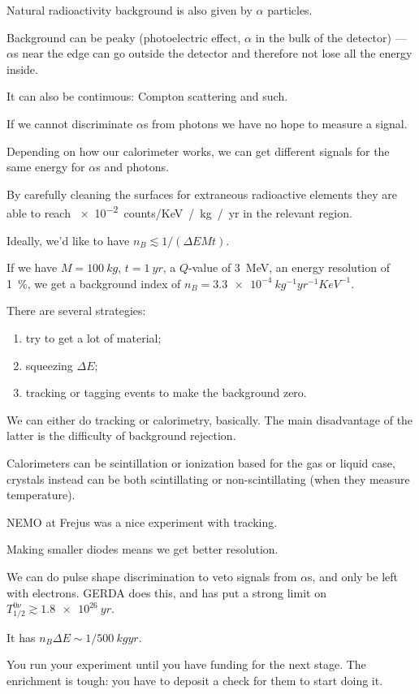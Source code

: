 \documentclass[main.tex]{subfiles}
\begin{document}

Natural radioactivity background is also given by \(\alpha \) particles. 

Background can be peaky (photoelectric effect, \(\alpha \) in the bulk of the detector) --- 
\(\alpha \)s near the edge can go outside the detector and therefore not lose all the energy inside.

It can also be continuous: Compton scattering and such. 

If we cannot discriminate \(\alpha \)s from photons we have no hope to measure a signal. 

Depending on how our calorimeter works, we can get different signals for the same energy 
for \(\alpha \)s and photons. 

By carefully cleaning the surfaces for extraneous radioactive elements 
they are able to reach \SI{e-2}{counts/ KeV / kg / yr} in the relevant region. 

Ideally, we'd like to have \(n_B \lesssim 1/ (\Delta E M t)\). 

If we have \(M = \SI{100}{kg}\), \(t = \SI{1}{yr}\), a \(Q\)-value of \SI{3}{MeV}, 
an energy resolution of \SI{1}{\percent}, 
we get a background index of \(n_B = \SI{3.3e-4}{kg^{-1} yr^{-1} KeV^{-1}}\). 

There are several strategies: 
\begin{enumerate}
    \item try to get a lot of material;
    \item squeezing \(\Delta E\);
    \item tracking or tagging events to make the background zero.
\end{enumerate}

We can either do tracking or calorimetry, basically. 
The main disadvantage of the latter is the difficulty of background rejection. 

Calorimeters can be scintillation or ionization based for the gas or liquid case, 
crystals instead can be both scintillating or non-scintillating 
(when they measure temperature). 

NEMO at Frejus was a nice experiment with tracking. 

Making smaller diodes means we get better resolution. 

We can do pulse shape discrimination to veto signals from \(\alpha \)s, and only be 
left with electrons. 
GERDA does this, and has put a strong limit on \(T^{0 \nu }_{1/2} \gtrsim \SI{1.8e26}{yr}\). 

It has \(n_B \Delta E \sim 1 / \SI{500}{kg yr}\). 

You run your experiment until you have funding for the next stage. 
The enrichment is tough: you have to deposit a check for them to start doing it.
\end{document}
